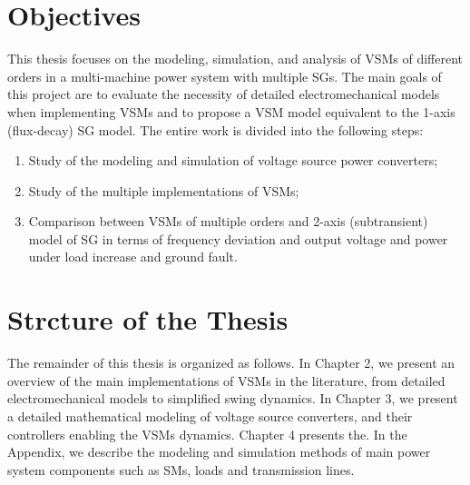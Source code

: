 \section{Objectives}
This thesis focuses on the modeling, simulation, and analysis of VSMs of
different orders in a multi-machine power system with multiple SGs. The main
goals of this project are to evaluate the necessity of detailed
electromechanical models when implementing VSMs and to propose a VSM model
equivalent to the 1-axis (flux-decay) SG model. The entire work is divided into
the following steps:

\begin{enumerate}
    \item Study of the modeling and simulation of voltage source power converters;
    \item Study of the multiple implementations of VSMs; 
    \item Comparison between VSMs of multiple orders and 2-axis (subtransient)
    model of SG in terms of frequency deviation and output voltage and power
    under load increase and ground fault.
\end{enumerate}

\section{Strcture of the Thesis}
The remainder of this thesis is organized as follows. In Chapter 2, we present
an overview of the main implementations of VSMs in the literature, from detailed
electromechanical models to simplified swing dynamics. In Chapter 3, we present
a detailed mathematical modeling of voltage source converters, and their
controllers enabling the VSMs dynamics. Chapter 4 presents the. In the Appendix,
we describe the modeling and simulation methods of main power system components
such as SMs, loads and transmission lines.